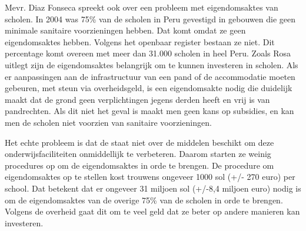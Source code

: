 Mevr. Diaz Fonseca spreekt ook over een probleem met eigendomsaktes van scholen. In 2004 was 75\% van de scholen in Peru gevestigd in gebouwen die geen minimale sanitaire voorzieningen hebben. Dat komt omdat ze geen eigendomsaktes hebben. Volgens het openbaar register bestaan ze niet. Dit percentage komt overeen met meer dan 31.000 scholen in heel Peru. Zoals Rosa uitlegt zijn de eigendomsaktes belangrijk om te kunnen investeren in scholen. Als er aanpassingen aan de infrastructuur van een pand of de accommodatie moeten gebeuren, met steun via overheidsgeld, is een eigendomsakte nodig die duidelijk maakt dat de grond geen verplichtingen jegens derden heeft en vrij is van pandrechten. Als dit niet het geval is maakt men geen kans op subsidies, en kan men de scholen niet voorzien van sanitaire voorzieningen.

Het echte probleem is dat de staat niet over de middelen beschikt om deze onderwijsfaciliteiten onmiddellijk te verbeteren. Daarom starten ze weinig procedures op om de eigendomsaktes in orde te brengen. De procedure om eigendomsaktes op te stellen kost trouwens ongeveer 1000 sol (+/- 270 euro) per school. Dat betekent dat er ongeveer 31 miljoen sol (+/-8,4 miljoen euro) nodig is om de eigendomsaktes van de overige 75\% van de scholen in orde te brengen. Volgens de overheid gaat dit om te veel geld dat ze beter op andere manieren kan investeren. \autocite{larepublica2004}
